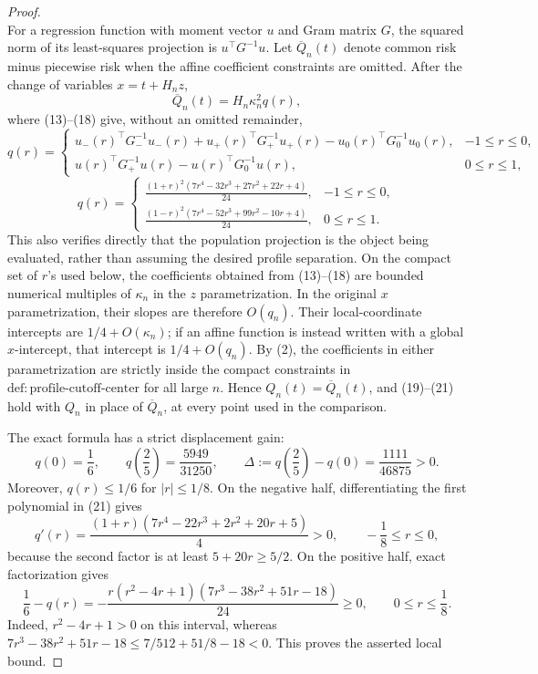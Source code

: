 \documentclass{article}
\begin{document}
\begin{proof}
\[ \tag{18}
\]
For a regression function with moment vector \(u\) and Gram matrix
\(G\), the squared norm of its least-squares projection is
\(u^\top G^{-1}u\).  Let \(\overline Q_n(t)\) denote common risk minus
piecewise risk when the affine coefficient constraints are omitted.
After the change of variables \(x=t+H_nz\),
\[
 \overline Q_n(t)=H_n\kappa_n^2q(r),
 \tag{19}
\]
where (13)--(18) give, without an omitted remainder,
\[
 q(r)=
 \begin{cases}
 u_-(r)^\top G_-^{-1}u_-(r)
 +u_+(r)^\top G_+^{-1}u_+(r)
 -u_0(r)^\top G_0^{-1}u_0(r),&-1\le r\le0,\\[3pt]
 u(r)^\top G_+^{-1}u(r)-u(r)^\top G_0^{-1}u(r),&0\le r\le1,
 \end{cases}
 \tag{20}
\]
\[
 q(r)=
 \begin{cases}
 \displaystyle
 \frac{(1+r)^2(7r^4-32r^3+27r^2+22r+4)}{24},&-1\le r\le0,\\[7pt]
 \displaystyle
 \frac{(1-r)^2(7r^4-52r^3+99r^2-10r+4)}{24},&0\le r\le1.
 \end{cases}
 \tag{21}
\]
This also verifies directly that the population projection is the
object being evaluated, rather than assuming the desired profile
separation.  On the compact set of \(r\)'s used below, the coefficients
obtained from (13)--(18) are bounded numerical multiples of
\(\kappa_n\) in the \(z\) parametrization.  In the original
\(x\) parametrization, their slopes are therefore \(O(q_n)\).  Their
local-coordinate intercepts are \(1/4+O(\kappa_n)\); if an affine
function is instead written with a global \(x\)-intercept, that
intercept is \(1/4+O(q_n)\).  By (2), the coefficients in either
parametrization are strictly inside the compact constraints in
\(\mathrm{def:profile\mbox{-}cutoff\mbox{-}center}\) for all large
\(n\).  Hence \(Q_n(t)=\overline Q_n(t)\), and (19)--(21) hold with
\(Q_n\) in place of \(\overline Q_n\), at every point used in the
comparison.

The exact formula has a strict displacement gain:
\[
 q(0)=\frac16,
 \qquad
 q\left(\frac25\right)=\frac{5949}{31250},
 \qquad
 \Delta:=q\left(\frac25\right)-q(0)
       =\frac{1111}{46875}>0.
 \tag{22}
\]
Moreover, \(q(r)\le1/6\) for \(|r|\le1/8\).  On the negative half,
differentiating the first polynomial in (21) gives
\[
 q'(r)=\frac{(1+r)(7r^4-22r^3+2r^2+20r+5)}4>0,
 \qquad -\frac18\le r\le0,
 \tag{23}
\]
because the second factor is at least
\(5+20r\ge5/2\).  On the positive half, exact factorization gives
\[
 \frac16-q(r)
 =-\frac{r(r^2-4r+1)(7r^3-38r^2+51r-18)}{24}\ge0,
 \qquad 0\le r\le\frac18.
 \tag{24}
\]
Indeed, \(r^2-4r+1>0\) on this interval, whereas
\(7r^3-38r^2+51r-18\le7/512+51/8-18<0\).  This proves the asserted
local bound.


\end{proof}
\end{document}

